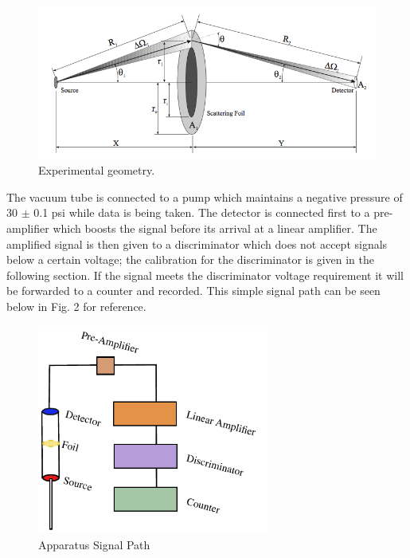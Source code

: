\begin{figure}[H]
\begin{center}
\includegraphics[width=5.5in]{apparatus.png}
\caption{Experimental geometry.}
\end{center}
\end{figure}

\indent \indent The vacuum tube is connected to a pump which maintains a negative pressure of 30 $\pm$ 0.1 psi while data is being taken.  The detector is connected first to a pre-amplifier which boosts the signal before its arrival at a linear amplifier.  The amplified signal is then given to a discriminator which does not accept signals below a certain voltage; the calibration for the discriminator is given in the following section.  If the signal meets the discriminator voltage requirement it will be forwarded to a counter and recorded. This simple signal path can be seen below in Fig. 2 for reference.    


\begin{figure}[H]
\begin{center}
\includegraphics[width=3in, angle=90]{Figure1Ap.pdf}
\caption{Apparatus Signal Path}
\end{center}
\end{figure}

